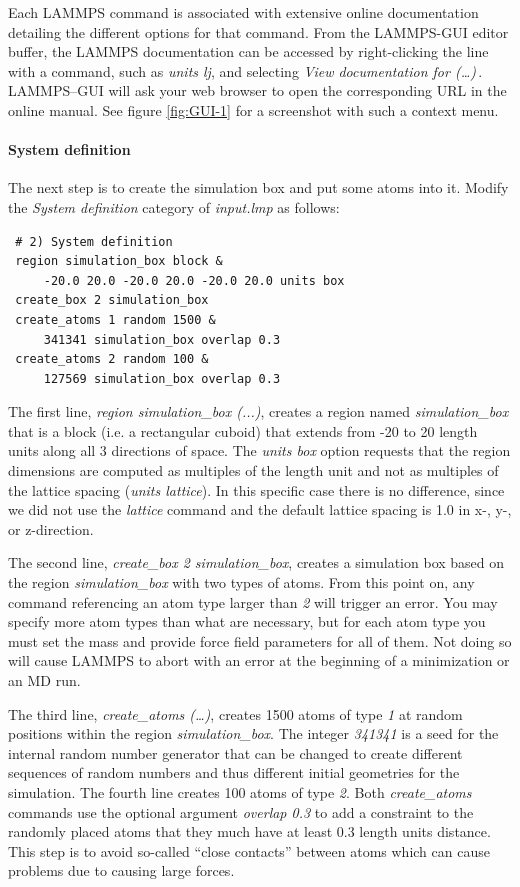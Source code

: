 \documentclass[9pt,tutorial]{livecoms}
\begin{document}
Each LAMMPS command is associated with extensive online documentation
detailing the different options for that command.  From the LAMMPS-GUI
editor buffer, the LAMMPS documentation can be accessed by
right-clicking the line with a command, such as \textit{units lj}, and
selecting \textit{View documentation for (\dots)}\,.  LAMMPS--GUI will
ask your web browser to open the corresponding URL in the online manual.
See figure \ref{fig:GUI-1} for a screenshot with such a context menu.

\paragraph{System definition}

The next step is to create the simulation box and put some atoms into it.
Modify the \textit{System definition} category of \textit{input.lmp} as follows:
{\normalsize
\begin{verbatim}
 # 2) System definition
 region simulation_box block &
     -20.0 20.0 -20.0 20.0 -20.0 20.0 units box
 create_box 2 simulation_box
 create_atoms 1 random 1500 &
     341341 simulation_box overlap 0.3
 create_atoms 2 random 100 &
     127569 simulation_box overlap 0.3
\end{verbatim}
}

The first line, \textit{region simulation\_box (...)}, creates a region
named \textit{simulation\_box} that is a block (i.e. a rectangular
cuboid) that extends from -20 to 20 length units along all 3 directions
of space.  The \textit{units box} option requests that the region dimensions
are computed as multiples of the length unit and not as multiples of the
lattice spacing (\textit{units lattice}).  In this specific case there is
no difference, since we did not use the \textit{lattice} command and the
default lattice spacing is 1.0 in x-, y-, or z-direction.

The second line, \textit{create\_box 2 simulation\_box}, creates a
simulation box based on the region \textit{simulation\_box} with two
types of atoms.  From this point on, any command referencing an atom
type larger than \textit{2} will trigger an error.  You may specify more
atom types than what are necessary, but for each atom type you must set
the mass and provide force field parameters for all of them. Not doing
so will cause LAMMPS to abort with an error at the beginning of a
minimization or an MD run.

The third line, \textit{create\_atoms (\dots)}, creates 1500 atoms of type
\textit{1} at random positions within the region
\textit{simulation\_box}.  The integer \textit{341341} is a seed for the
internal random number generator that can be changed to create different
sequences of random numbers and thus different initial geometries for
the simulation.  The fourth line creates 100 atoms of type \textit{2}.
Both \textit{create\_atoms} commands use the optional argument
\textit{overlap 0.3} to add a constraint to the randomly placed atoms
that they much have at least 0.3 length units distance.  This step is to
avoid so-called ``close contacts'' between atoms which can cause
problems due to causing large forces.
\end{document}
